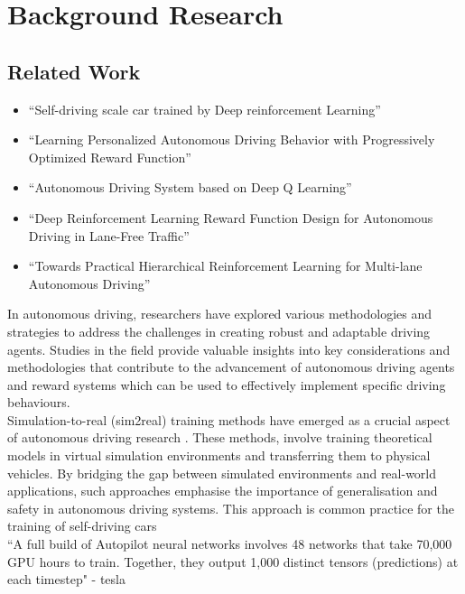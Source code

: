 \documentclass{article}
\begin{document}
\section{Background Research}

\subsection{Related Work}
\label{sec:related-work}
\begin{itemize}
    \item “Self-driving scale car trained by Deep reinforcement Learning”
    \item “Learning Personalized Autonomous Driving Behavior with Progressively Optimized Reward Function”
    \item “Autonomous Driving System based on Deep Q Learning” 
    \item “Deep Reinforcement Learning Reward Function Design for Autonomous Driving in Lane-Free Traffic”
    \item “Towards Practical Hierarchical Reinforcement Learning for Multi-lane Autonomous Driving”
\end{itemize}

In autonomous driving, researchers have explored various methodologies and strategies to address the challenges in creating robust and adaptable driving agents. Studies in the field provide valuable insights into key considerations and methodologies that contribute to the advancement of autonomous driving agents and reward systems which can be used to effectively implement specific driving behaviours.\\

Simulation-to-real (sim2real) training methods have emerged as a crucial aspect of autonomous driving research \cite{sim2real}. These methods, involve training theoretical models in virtual simulation environments and transferring them to physical vehicles. By bridging the gap between simulated environments and real-world applications, such approaches emphasise the importance of generalisation and safety in autonomous driving systems. This approach is common practice for the training of self-driving cars  \\

``A full build of Autopilot neural networks involves 48 networks that take 70,000 GPU hours to train. Together, they output 1,000 distinct tensors (predictions) at each timestep" - tesla \\
\end{document}
